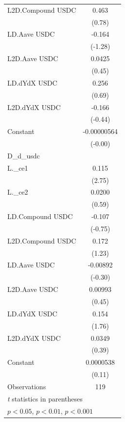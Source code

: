 {\begin{tabular}{l*{1}{c}}
\addlinespace
L2D.Compound USDC   &       0.463         \\
                    &      (0.78)         \\
\addlinespace
LD.Aave USDC        &      -0.164         \\
                    &     (-1.28)         \\
\addlinespace
L2D.Aave USDC       &      0.0425         \\
                    &      (0.45)         \\
\addlinespace
LD.dYdX USDC        &       0.256         \\
                    &      (0.69)         \\
\addlinespace
L2D.dYdX USDC       &      -0.166         \\
                    &     (-0.44)         \\
\addlinespace
Constant            & -0.00000564         \\
                    &     (-0.00)         \\
\midrule
D\_d\_usdc            &                     \\
L.\_ce1              &       0.115\sym{**} \\
                    &      (2.75)         \\
\addlinespace
L.\_ce2              &      0.0200         \\
                    &      (0.59)         \\
\addlinespace
LD.Compound USDC    &      -0.107         \\
                    &     (-0.75)         \\
\addlinespace
L2D.Compound USDC   &       0.172         \\
                    &      (1.23)         \\
\addlinespace
LD.Aave USDC        &    -0.00892         \\
                    &     (-0.30)         \\
\addlinespace
L2D.Aave USDC       &     0.00993         \\
                    &      (0.45)         \\
\addlinespace
LD.dYdX USDC        &       0.154         \\
                    &      (1.76)         \\
\addlinespace
L2D.dYdX USDC       &      0.0349         \\
                    &      (0.39)         \\
\addlinespace
Constant            &   0.0000538         \\
                    &      (0.11)         \\
\midrule
Observations        &         119         \\
\bottomrule
\multicolumn{2}{l}{\footnotesize \textit{t} statistics in parentheses}\\
\multicolumn{2}{l}{\footnotesize \sym{*} \(p<0.05\), \sym{**} \(p<0.01\), \sym{***} \(p<0.001\)}\\
\end{tabular}
}
